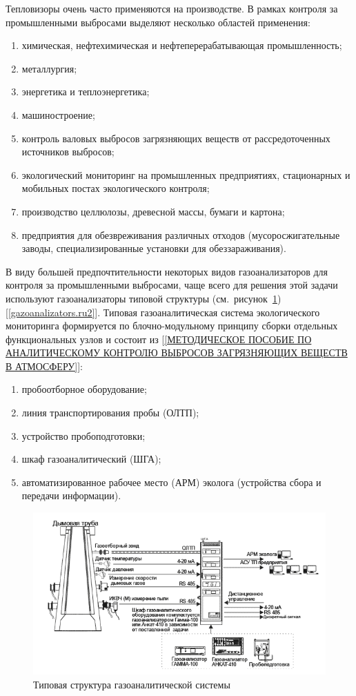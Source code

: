 \documentclass[14pt, a4paper]{extreport}
\begin{document}
	Тепловизоры очень часто применяются на производстве. В рамках контроля за промышленными выбросами выделяют несколько областей применения:
	\begin{enumerate}[label={\arabic*)}]
		\item химическая, нефтехимическая и нефтеперерабатывающая промышленность;
		\item металлургия;
		\item энергетика и теплоэнергетика;
		\item машиностроение;
		\item контроль валовых выбросов загрязняющих веществ от рассредоточенных источников выбросов;
		\item экологический мониторинг на промышленных предприятиях, стационарных и мобильных постах экологического контроля;
		\item производство целлюлозы, древесной массы, бумаги и картона;
		\item предприятия для обезвреживания различных отходов (мусоросжигательные заводы, специализированные установки для обеззараживания).
	\end{enumerate}
	
	В виду большей предпочтительности некоторых видов газоанализаторов для контроля за промышленными выбросами, чаще всего для решения этой задачи используют газоанализаторы типовой структуры (см.~рисунок~\ref{fig:typestructure}) [\ref{gazoanalizators.ru2}]. Типовая газоаналитическая система экологического мониторинга формируется по блочно-модульному принципу сборки отдельных функциональных узлов и состоит из [\ref{МЕТОДИЧЕСКОЕ ПОСОБИЕ ПО АНАЛИТИЧЕСКОМУ КОНТРОЛЮ ВЫБРОСОВ ЗАГРЯЗНЯЮЩИХ ВЕЩЕСТВ В АТМОСФЕРУ}]:
	\begin{enumerate}[label={\arabic*)}]
		\item пробоотборное оборудование;
		\item линия транспортирования пробы (ОЛТП);
		\item устройство пробоподготовки;
		\item шкаф газоаналитический (ШГА);
		\item автоматизированное рабочее место (АРМ) эколога (устройства сбора и передачи информации).
	\end{enumerate}
	
	\begin{figure}[h!]
		\centering
		\includegraphics[width = \textwidth]{image/chapter_1/typestructure}	
		\caption{Типовая структура газоаналитической системы}
		\label{fig:typestructure}
	\end{figure}
	
\end{document}
